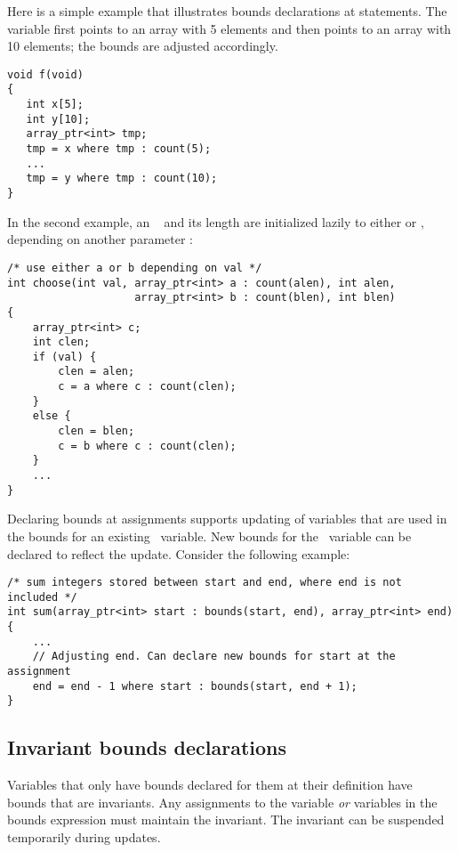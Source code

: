 Here is a simple example that illustrates bounds declarations at
statements. The variable  first points to an array with 5
elements and then points to an array with 10 elements; the bounds are
adjusted accordingly.

\begin{lstlisting}
void f(void)
{
   int x[5];
   int y[10];
   array_ptr<int> tmp;
   tmp = x where tmp : count(5);
   ...
   tmp = y where tmp : count(10);
}
\end{lstlisting}

In the second example, an \arrayptr\  and its length are initialized
lazily to either  or , depending on another parameter :

\begin{lstlisting}
/* use either a or b depending on val */
int choose(int val, array_ptr<int> a : count(alen), int alen,
                    array_ptr<int> b : count(blen), int blen)
{
    array_ptr<int> c;
    int clen;
    if (val) {
        clen = alen;
        c = a where c : count(clen);
    }
    else {
        clen = blen;
        c = b where c : count(clen);
    }
    ...
}
\end{lstlisting}

Declaring bounds at assignments supports updating of variables that are
used in the bounds for an existing \arrayptr\ variable. New
bounds for the \arrayptr\ variable can be declared to reflect
the update. Consider the following example:

\begin{lstlisting}
/* sum integers stored between start and end, where end is not included */
int sum(array_ptr<int> start : bounds(start, end), array_ptr<int> end)
{
    ...
    // Adjusting end. Can declare new bounds for start at the assignment
    end = end - 1 where start : bounds(start, end + 1);
}
\end{lstlisting}


\subsection{Invariant bounds declarations}
\label{section:invariant-bounds-declarations}

Variables that only have bounds declared for them at their definition
have bounds that are invariants. Any assignments to the variable
\emph{or} variables in the bounds expression must maintain the
invariant. The invariant can be suspended temporarily during updates.

